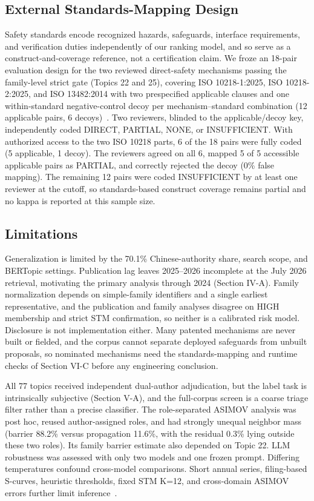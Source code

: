 \documentclass[letterpaper,9pt,conference]{ieeeconf}
\begin{document}
\subsection{External Standards-Mapping Design}

Safety standards encode recognized hazards, safeguards, interface requirements, and verification duties independently of our ranking model, and so serve as a construct-and-coverage reference, not a certification claim. We froze an 18-pair evaluation design for the two reviewed direct-safety mechanisms passing the family-level strict gate (Topics 22 and 25), covering ISO 10218-1:2025, ISO 10218-2:2025, and ISO 13482:2014 with two prespecified applicable clauses and one within-standard negative-control decoy per mechanism--standard combination (12 applicable pairs, 6 decoys)~\cite{iso10218_1,iso10218_2,iso13482_2014}. Two reviewers, blinded to the applicable/decoy key, independently coded DIRECT, PARTIAL, NONE, or INSUFFICIENT. With authorized access to the two ISO 10218 parts, 6 of the 18 pairs were fully coded (5 applicable, 1 decoy). The reviewers agreed on all 6, mapped 5 of 5 accessible applicable pairs as PARTIAL, and correctly rejected the decoy (0\% false mapping). The remaining 12 pairs were coded INSUFFICIENT by at least one reviewer at the cutoff, so standards-based construct coverage remains partial and no kappa is reported at this sample size.

\subsection{Limitations}

Generalization is limited by the 70.1\% Chinese-authority share, search scope, and BERTopic settings. Publication lag leaves 2025--2026 incomplete at the July 2026 retrieval, motivating the primary analysis through 2024 (Section IV-A). Family normalization depends on simple-family identifiers and a single earliest representative, and the publication and family analyses disagree on HIGH membership and strict STM confirmation, so neither is a calibrated risk model. Disclosure is not implementation either. Many patented mechanisms are never built or fielded, and the corpus cannot separate deployed safeguards from unbuilt proposals, so nominated mechanisms need the standards-mapping and runtime checks of Section VI-C before any engineering conclusion.

All 77 topics received independent dual-author adjudication, but the label task is intrinsically subjective (Section V-A), and the full-corpus screen is a coarse triage filter rather than a precise classifier. The role-separated ASIMOV analysis was post hoc, reused author-assigned roles, and had strongly unequal neighbor mass (barrier 88.2\% versus propagation 11.6\%, with the residual 0.3\% lying outside these two roles). Its family barrier estimate also depended on Topic 22. LLM robustness was assessed with only two models and one frozen prompt. Differing temperatures confound cross-model comparisons. Short annual series, filing-based S-curves, heuristic thresholds, fixed STM K=12, and cross-domain ASIMOV errors further limit inference~\cite{gao2013,lee2016}.
\end{document}
